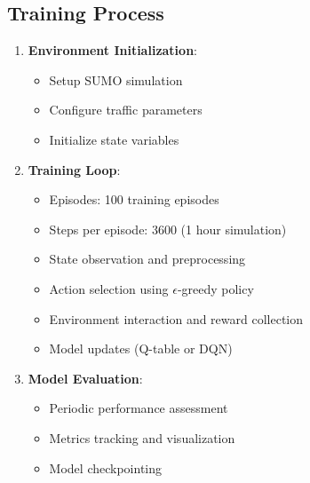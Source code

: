 \documentclass[a4paper, 12pt]{article}
\begin{document}
\subsection{Training Process}
\begin{tcolorbox}[title=Training Workflow]
\begin{enumerate}
    \item \textbf{Environment Initialization}:
    \begin{itemize}
        \item Setup SUMO simulation
        \item Configure traffic parameters
        \item Initialize state variables
    \end{itemize}
    
    \item \textbf{Training Loop}:
    \begin{itemize}
        \item Episodes: 100 training episodes
        \item Steps per episode: 3600 (1 hour simulation)
        \item State observation and preprocessing
        \item Action selection using $\epsilon$-greedy policy
        \item Environment interaction and reward collection
        \item Model updates (Q-table or DQN)
    \end{itemize}
    
    \item \textbf{Model Evaluation}:
    \begin{itemize}
        \item Periodic performance assessment
        \item Metrics tracking and visualization
        \item Model checkpointing
    \end{itemize}
\end{enumerate}
\end{tcolorbox}
\end{document}
